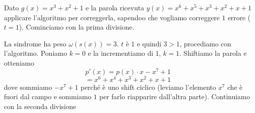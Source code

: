 \documentclass[12pt]{report}
\begin{document}
    \begin{exmp}
        Dato $g(x) = x^3 + x^2 + 1$ e la parola ricevuta $y(x) = x^6 + x^5 + x^3 + x^2 + x + 1$ applicare l'algoritmo per correggerla, sapendoo che vogliamo correggere $1$ errore ($t = 1$). Cominciamo con la prima divisione.

        \begin{center}
        \end{center}

        \noindent
        La sindrome ha peso $\omega(s(x)) = 3$. $t$ è $1$ e quindi $3 > 1$, procediamo con l'algoritmo. Poniamo $k = 0$ e la incrementiamo di $1$, $k = 1$. Shiftiamo la parola e otteniamo
        $$p'(x) = p(x) \cdot x - x^7 + 1$$
        $$= x^6 + x^4 + x^3 + x^2 + x + 1$$
        dove sommiamo $-x^7 + 1 $ perché è uno shift ciclico (leviamo l'elemento $x^7$ che è fuori dal campo e sommiamo $1$ per farlo riapparire dall'altra parte).
        Continuiamo con la seconda divisione

        \begin{center}
        \end{center}


\end{exmp}
\end{document}

